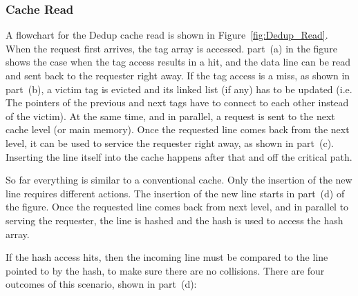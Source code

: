 \subsubsection{Cache Read}
A flowchart for the Dedup cache read is shown in Figure~\ref{fig:Dedup_Read}. When the request first arrives, the tag array is accessed. part~(a) in the figure shows the case when the tag access results in a hit, and the data line can be read and sent back to the requester right away. If the tag access is a miss, as shown in part~(b), a victim tag is evicted and its linked list (if any) has to be updated (i.e. The pointers of the previous and next tags have to connect to each other instead of the victim). At the same time, and in parallel, a request is sent to the next cache level (or main memory). Once the requested line comes back from the next level, it can be used to service the requester right away, as shown in part~(c). Inserting the line itself into the cache happens after that and off the critical path.\par
So far everything is similar to a conventional cache. Only the insertion of the new line requires different actions. The insertion of the new line starts in part~(d) of the figure. Once the requested line comes back from next level, and in parallel to serving the requester, the line is hashed and the hash is used to access the hash array.\par
If the hash access hits, then the incoming line must be compared to the line pointed to by the hash, to make sure there are no collisions. There are four outcomes of this scenario, shown in part~(d):
